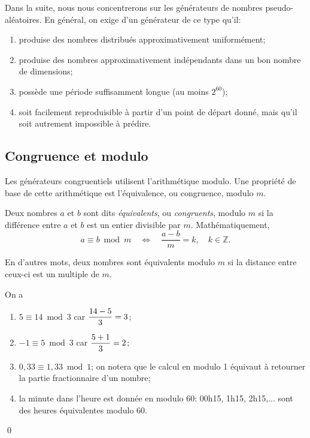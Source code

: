 Dans la suite, nous nous concentrerons sur les générateurs de nombres
pseudo-aléatoires. En général, on exige d'un générateur de ce type
qu'il:
\begin{enumerate}
\item produise des nombres distribués approximativement uniformément;
\item produise des nombres approximativement indépendants dans un bon
  nombre de dimensions;
\item possède une période suffisamment longue (au moins $2^{60}$);
\item soit facilement reproduisible à partir d'un point de départ
  donné, mais qu'il soit autrement impossible à prédire.
\end{enumerate}


\subsection{Congruence et modulo}

Les générateurs congruentiels utilisent l'arithmétique modulo. Une
propriété de base de cette arithmétique est l'équivalence, ou
congruence, modulo $m$.

\begin{definition}
  Deux nombres $a$ et $b$ sont dits \emph{équivalents}, ou
  \emph{congruents}, modulo $m$ si la différence entre $a$ et $b$ est
  un entier divisible par $m$. Mathématiquement,
  \begin{displaymath}
    a \equiv b \bmod m \quad\Leftrightarrow\quad \frac{a - b}{m} = k, \quad
    k \in \mathbb{Z}.
  \end{displaymath}
\end{definition}

En d'autres mots, deux nombres sont équivalents modulo $m$ si la
distance entre ceux-ci est un multiple de $m$.

\begin{exemple}
  On a
  \begin{enumerate}
  \item $5 \equiv 14 \bmod 3$ car $\displaystyle \frac{14 - 5}{3} = 3$;
  \item $-1 \equiv 5 \bmod 3$ car $\displaystyle \frac{5 + 1}{3} = 2$;
  \item $0,33 \equiv 1,33 \bmod 1$; on notera que le calcul en modulo 1
    équivaut à retourner la partie fractionnaire d'un nombre;
  \item la minute dans l'heure est donnée en modulo 60: 00h15, 1h15,
    2h15,... sont des heures équivalentes modulo 60.
  \end{enumerate}
  \qed
\end{exemple}

